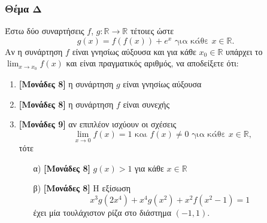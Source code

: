 \documentclass[12pt]{article}
\begin{document}
  \section*{Θέμα Δ}
    \noindent
    Έστω δύο συναρτήσεις $f$, $g:\mathbb{R}\to\mathbb{R}$ τέτοιες ώστε $$g(x)=f\left(f(x)\right)+e^x \text{ για κάθε } x\in\mathbb{R}.$$
    Αν η συνάρτηση $f$ είναι γνησίως αύξουσα και για κάθε $x_0\in\mathbb{R}$ υπάρχει το $\lim_{x\to x_0}f(x)$ και είναι πραγματικός αριθμός, να αποδείξετε ότι:
    \begin{enumerate}
      \item \textbf{[Μονάδες 8]} η συνάρτηση $g$ είναι γνησίως αύξουσα
      \item \textbf{[Μονάδες 8]} η συνάρτηση $f$ είναι συνεχής
      \item \textbf{[Μονάδες 9]} αν επιπλέον ισχύουν οι σχέσεις
      $$\lim_{x\to 0}f(x)=1 \text{ και } f(x)\ne 0 \text{ για κάθε } x\in\mathbb{R},$$ τότε
      \begin{enumerate}
        \item [α)]  \textbf{[Μονάδες 8]} $g(x)>1$ για κάθε $x\in\mathbb{R}$
        \item [β)]  \textbf{[Μονάδες 8]} Η εξίσωση
        $$x^3g\left(2x^4\right)+x^4g\left(x^2\right)+x^2f\left(x^2-1\right)=1$$
        έχει μία τουλάχιστον ρίζα στο διάστημα $(-1,1)$.
      \end{enumerate}
    \end{enumerate}

\vspace{3\baselineskip}

\part*{}
\end{document}
